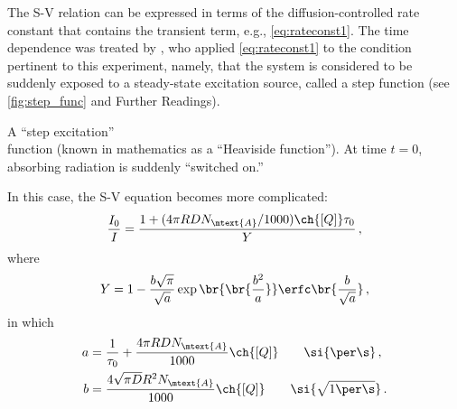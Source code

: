 The S-V relation can be expressed in terms of the diffusion-controlled rate constant that contains the transient term, e.g., \cref{eq:rateconst1}. 
The time dependence was treated by \textcite{ware66}, who applied \cref{eq:rateconst1} to the condition pertinent to this experiment, namely, that the system is considered to be suddenly exposed to a steady-state excitation source, called a step function (see \cref{fig:step_func} and Further Readings). %
\begin{marginfigure}
	\centering
	\caption{A ``step excitation''\\ function (known in mathematics as a ``Heaviside function''). At time \( {t = 0} \), absorbing radiation is suddenly ``switched on.''}
	\label{fig:step_func}
\end{marginfigure}%
In this case, the S-V equation becomes more complicated:
\begin{equation}
	\frac{I_0}{I} = \frac{1 + (4 \pi R D N_\mtext{A} / 1000) \ch{[Q]} \tau_0}{Y} \, ,
	\label{eq:sv_step_rel}
\end{equation}
where
\begin{equation}
	Y = 1 - \frac{b \sqrt{\pi}}{\sqrt{a}} \exp\br{\br{ \frac{b^2}{a} }} \erfc\br{ \frac{b}{\sqrt{a}} } \, ,
	\label{eq:sv_y}
\end{equation}
in which 
\begin{align*}
	a &= \frac{1}{\tau_0} + \frac{4 \pi R D N_\mtext{A}}{1000} \ch{[Q]} \qquad \si{\per\s} \, ,\\
	b &= \frac{4 \sqrt{\pi D} R^2 N_\mtext{A}}{1000} \ch{[Q]} \qquad \si{\sqrt{1\per\s}}\, .
\end{align*}
